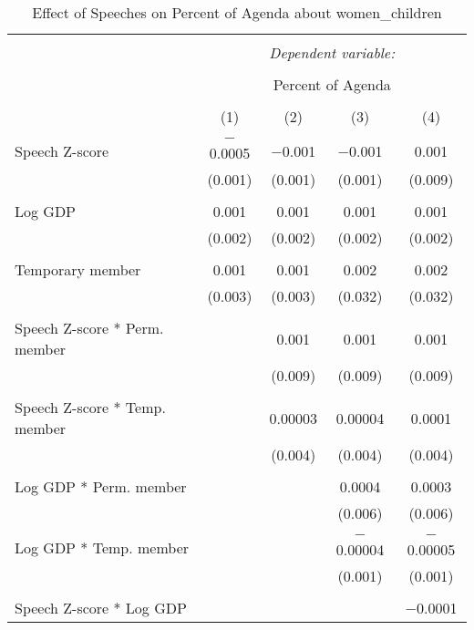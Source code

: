 
\begin{table}[!htbp] \centering 
  \caption{Effect of Speeches on Percent of Agenda about women_children} 
  \label{} 
\begin{tabular}{@{\extracolsep{5pt}}lcccc} 
\\[-1.8ex]\hline 
\hline \\[-1.8ex] 
 & \multicolumn{4}{c}{\textit{Dependent variable:}} \\ 
\cline{2-5} 
\\[-1.8ex] & \multicolumn{4}{c}{Percent of Agenda} \\ 
\\[-1.8ex] & (1) & (2) & (3) & (4)\\ 
\hline \\[-1.8ex] 
 Speech Z-score & $-$0.0005 & $-$0.001 & $-$0.001 & 0.001 \\ 
  & (0.001) & (0.001) & (0.001) & (0.009) \\ 
  & & & & \\ 
 Log GDP & 0.001 & 0.001 & 0.001 & 0.001 \\ 
  & (0.002) & (0.002) & (0.002) & (0.002) \\ 
  & & & & \\ 
 Temporary member & 0.001 & 0.001 & 0.002 & 0.002 \\ 
  & (0.003) & (0.003) & (0.032) & (0.032) \\ 
  & & & & \\ 
 Speech Z-score * Perm. member &  & 0.001 & 0.001 & 0.001 \\ 
  &  & (0.009) & (0.009) & (0.009) \\ 
  & & & & \\ 
 Speech Z-score * Temp. member &  & 0.00003 & 0.00004 & 0.0001 \\ 
  &  & (0.004) & (0.004) & (0.004) \\ 
  & & & & \\ 
 Log GDP * Perm. member &  &  & 0.0004 & 0.0003 \\ 
  &  &  & (0.006) & (0.006) \\ 
  & & & & \\ 
 Log GDP * Temp. member &  &  & $-$0.00004 & $-$0.00005 \\ 
  &  &  & (0.001) & (0.001) \\ 
  & & & & \\ 
 Speech Z-score * Log GDP &  &  &  & $-$0.0001 \\ 

\end{tabular}
\end{table}
